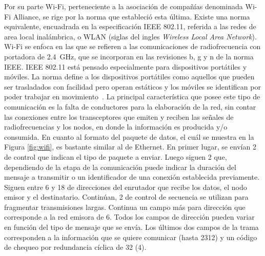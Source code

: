 Por su parte Wi-Fi, perteneciente a la asociación de compañías denominada Wi-Fi Alliance, se rige por la norma que estableció esta última. Existe una norma equivalente, encuadrada en la especificación IEEE 802.11, referida a las redes de area local inalámbrica, o WLAN (siglas del ingles {\it Wireless Local Area Network}). Wi-Fi se enfoca en las que se refieren a las comunicaciones de radiofrecuencia con portadora de \SI{2,4}{\giga\hertz}, que se incorporan en las revisiones b, g y n de la norma IEEE. IEEE 802.11 está pensado especialmente para dispositivos portátiles y móviles. La norma define a los dispositivos portátiles como aquellos que pueden ser trasladados con facilidad pero operan estáticos y los móviles se identifican por poder trabajar en movimiento~\cite{wifi2016}. La principal característica que posee este tipo de comunicación es la falta de conductores para la elaboración de la red, sin contar las conexiones entre los transceptores que emiten y reciben las señales de radiofrecuencias y los nodos, en donde la información es producida y/o consumida. En cuanto al formato del paquete de datos, el cuál se muestra en la Figura \ref{fig:wifi}, es bastante similar al de Ethernet. En primer lugar, se envían \SI{2}{\byte} de control que indican el tipo de paquete a enviar. Luego siguen \SI{2}{\byte} que, dependiendo de la etapa de la comunicación puede indicar la duración del mensaje a transmitir o un identificador de una conexión establecida previamente. Siguen entre \si{6} y \SI{18}{\byte} de direcciones del enrutador que recibe los datos, el nodo emisor y el destinatario. Continúan, \SI{2}{\byte} de control de secuencia se utilizan para fragmentar transmisiones largas. Continua un campo más para dirección que corresponde a la red emisora de \SI{6}{\byte}. Todos los campos de dirección pueden variar en función del tipo de mensaje que se envía. Los últimos dos campos de la trama corresponden a la información que se quiere comunicar (hasta \SI{2312}{\byte}) y un código de chequeo por redundancia cíclica de \SI{32}{\bit} (\SI{4}{\byte}).%

